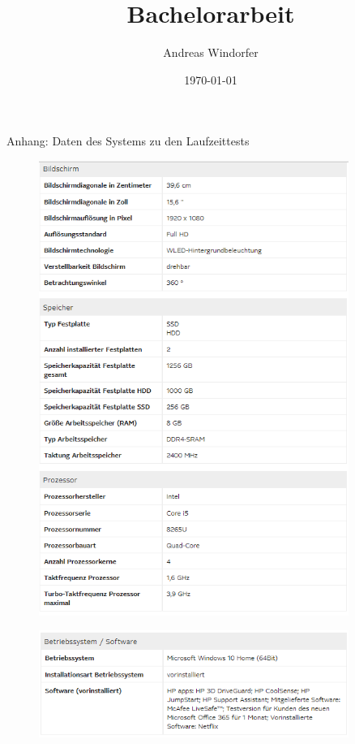 \documentclass[a4paper,12pt]{article}
\title{Bachelorarbeit}
\author{
	Andreas Windorfer\\
}
\date{\today}
\begin{document}
\pagestyle{empty}
\large Anhang: Daten des Systems zu den Laufzeittests

\begin{figure}[H]
	\centering
	\includegraphics[width= 0.9\textwidth]{"Medien/laufzeittest/hpHard"}

\end{figure}
\begin{figure}[H]
	\centering
	\includegraphics[width= 0.9\textwidth]{"Medien/laufzeittest/hpSoft"}
\end{figure}
\end{document}
